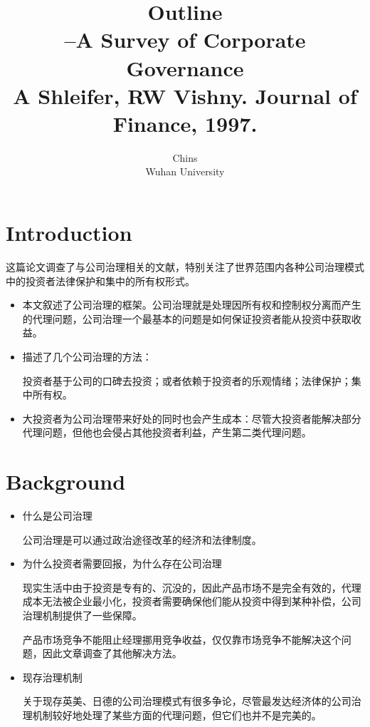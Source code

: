 \documentclass[a4paper]{article}
\title{Outline\\
	{\wuhao --A Survey of Corporate Governance\\
	A Shleifer, RW Vishny. Journal of Finance, 1997. }
}
\author{\vspace{1em}
	{\Large Chins}\\
	Wuhan University
}
\date{}
\newcommand{\sihao}{\fontsize{14pt}{21pt}\selectfont}
\begin{document}
	\maketitle
	\sihao%
	
\section{Introduction}
	这篇论文调查了与公司治理相关的文献，特别关注了世界范围内各种公司治理模式中的投资者法律保护和集中的所有权形式。\par 

	\begin{itemize}
		\item 本文叙述了公司治理的框架。公司治理就是处理因所有权和控制权分离而产生的代理问题，公司治理一个最基本的问题是如何保证投资者能从投资中获取收益。
		\item 描述了几个公司治理的方法：\par
		投资者基于公司的口碑去投资；或者依赖于投资者的乐观情绪；法律保护；集中所有权。
		\item 大投资者为公司治理带来好处的同时也会产生成本：尽管大投资者能解决部分代理问题，但他也会侵占其他投资者利益，产生第二类代理问题。
	\end{itemize}

\section{Background}
	\begin{itemize}
		\item 什么是公司治理\par
		公司治理是可以通过政治途径改革的经济和法律制度。
		\item 为什么投资者需要回报，为什么存在公司治理\par
		现实生活中由于投资是专有的、沉没的，因此产品市场不是完全有效的，代理成本无法被企业最小化，投资者需要确保他们能从投资中得到某种补偿，公司治理机制提供了一些保障。\par
		产品市场竞争不能阻止经理挪用竞争收益，仅仅靠市场竞争不能解决这个问题，因此文章调查了其他解决方法。
		\item 现存治理机制\par
		关于现存英美、日德的公司治理模式有很多争论，尽管最发达经济体的公司治理机制较好地处理了某些方面的代理问题，但它们也并不是完美的。
		
	\end{itemize}
\end{document}

